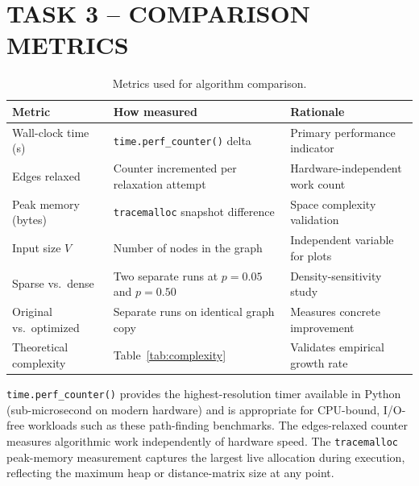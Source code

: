\documentclass[12pt,a4paper]{article}
\begin{document}
	\section{TASK 3 -- COMPARISON METRICS}
	
	\begin{table}[h!]
		\centering
		\caption{Metrics used for algorithm comparison.}
		\label{tab:metrics}
		\renewcommand{\arraystretch}{1.3}
		\begin{tabular}{lll}
			\toprule
			\textbf{Metric}         & \textbf{How measured}                              & \textbf{Rationale} \\
			\midrule
			Wall-clock time (s)     & \texttt{time.perf\_counter()} delta                & Primary performance indicator \\
			Edges relaxed           & Counter incremented per relaxation attempt         & Hardware-independent work count \\
			Peak memory (bytes)     & \texttt{tracemalloc} snapshot difference           & Space complexity validation \\
			Input size $V$          & Number of nodes in the graph                       & Independent variable for plots \\
			Sparse vs.\ dense       & Two separate runs at $p{=}0.05$ and $p{=}0.50$    & Density-sensitivity study \\
			Original vs.\ optimized & Separate runs on identical graph copy              & Measures concrete improvement \\
			Theoretical complexity  & Table~\ref{tab:complexity}                         & Validates empirical growth rate \\
			\bottomrule
		\end{tabular}
	\end{table}
	
	\noindent \texttt{time.perf\_counter()} provides the highest-resolution timer
	available in Python (sub-microsecond on modern hardware) and is appropriate for
	CPU-bound, I/O-free workloads such as these path-finding benchmarks. The
	edges-relaxed counter measures algorithmic work independently of hardware speed.
	The \texttt{tracemalloc} peak-memory measurement captures the largest live
	allocation during execution, reflecting the maximum heap or distance-matrix size
	at any point.
	
\end{document}
